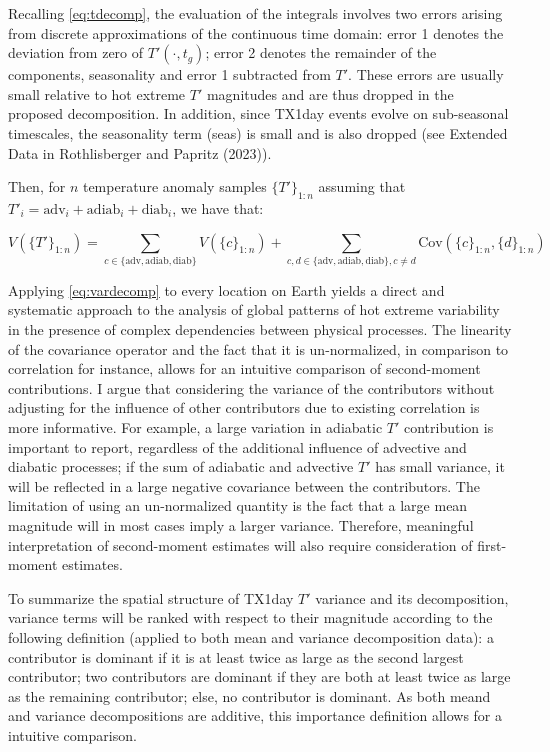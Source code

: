 \documentclass[11pt,a4paper,twoside,openright]{report}
\theoremstyle{definition}
\begin{document}
Recalling \eqref{eq:tdecomp}, the evaluation of the integrals involves two errors arising from discrete approximations of the continuous time domain: error 1 denotes the deviation from zero of \(T'(\cdot ,t_g)\); error 2 denotes the remainder of the components, seasonality and error 1 subtracted from \(T'\). These errors are usually small relative to hot extreme \(T'\) magnitudes and are thus dropped in the proposed decomposition. In addition, since TX1day events evolve on sub-seasonal timescales, the seasonality term (seas) is small and is also dropped (see Extended Data in Rothlisberger and Papritz (2023)).

Then, for \(n\) temperature anomaly samples \(\{ T' \}_{1:n}\) assuming that \({T'}_i = \text{adv}_i +\text{adiab}_i +\text{diab}_i\), we have that:

\begin{equation}
   V(\{ T' \}_{1:n}) = \sum_{c \in \{\text{adv},\text{adiab},\text{diab}\}} V(\{ c \}_{1:n} ) + \sum_{c, d \in \{\text{adv},\text{adiab},\text{diab}\} , c\neq d} \text{Cov}(\{ c \}_{1:n} ,\{ d \}_{1:n})
\label{eq:vardecomp}
\end{equation}

Applying \eqref{eq:vardecomp} to every location on Earth yields a direct and systematic approach to the analysis of global patterns of hot extreme variability in the presence of complex dependencies between physical processes. The linearity of the covariance operator and the fact that it is un-normalized, in comparison to correlation for instance, allows for an intuitive comparison of second-moment contributions. I argue that considering the variance of the contributors without adjusting for the influence of other contributors due to existing correlation is more informative. For example, a large variation in adiabatic \(T'\) contribution is important to report, regardless of the additional influence of advective and diabatic processes; if the sum of adiabatic and advective \(T'\) has small variance, it will be reflected in a large negative covariance between the contributors. The limitation of using an un-normalized quantity is the fact that a large mean magnitude will in most cases imply a larger variance. Therefore, meaningful interpretation of second-moment estimates will also require consideration of first-moment estimates.

To summarize the spatial structure of TX1day \(T'\) variance and its decomposition, variance terms will be ranked with respect to their magnitude according to the following definition (applied to both mean and variance decomposition data): a contributor is dominant if it is at least twice as large as the second largest contributor; two contributors are dominant if they are both at least twice as large as the remaining contributor; else, no contributor is dominant. As both meand and variance decompositions are additive, this importance definition allows for a intuitive comparison.
\end{document}
